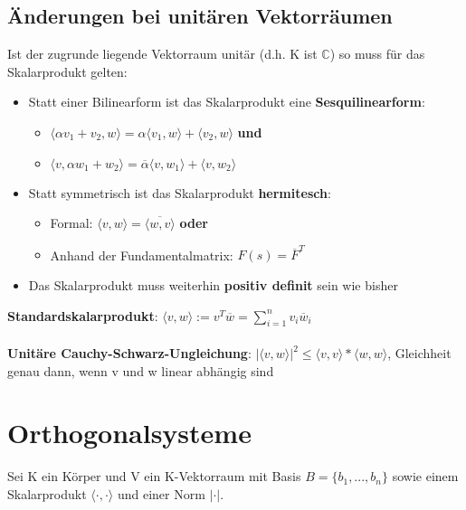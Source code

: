 \documentclass[10pt,a4paper]{article}
\def\complexnumbers{{\mathbb{C}}}
\begin{document}
	\subsection{Änderungen bei unitären Vektorräumen}
	Ist der zugrunde liegende Vektorraum unitär (d.h. K ist $\complexnumbers$) so muss für das Skalarprodukt gelten:
	\begin{itemize}
		\item Statt einer Bilinearform ist das Skalarprodukt eine \textbf{Sesquilinearform}:
		\begin{itemize}
			\item $\langle \alpha v_1 + v_2, w\rangle = \alpha\langle  v_1, w\rangle + \langle v_2, w\rangle$ \textbf{und}
			\item $\langle v, \alpha w_1 + w_2\rangle = \overline{\alpha}\langle  v, w_1\rangle + \langle v, w_2\rangle$
		\end{itemize}
		\item Statt symmetrisch ist das Skalarprodukt \textbf{hermitesch}:
			\begin{itemize}
				\item Formal: $\langle v, w\rangle = \overline{\langle w, v\rangle}$ \textbf{oder}
				\item Anhand der Fundamentalmatrix: $F(s) = \overline{F}^T$
			\end{itemize}
		\item Das Skalarprodukt muss weiterhin \textbf{positiv definit} sein wie bisher
	\end{itemize}
	\textbf{Standardskalarprodukt}: $\langle v, w\rangle := v^T\overline{w} = \sum_{i = 1}^{n} v_i\overline{w}_i$\\\\
	\textbf{Unitäre Cauchy-Schwarz-Ungleichung}: $|\langle v, w\rangle|^2 \leq \langle v, v\rangle * \langle w, w\rangle$, Gleichheit genau dann, wenn v und w linear abhängig sind
	
	\section{Orthogonalsysteme}
	Sei K ein Körper und V ein K-Vektorraum mit Basis $B = \{b_1, ..., b_n\}$ sowie einem Skalarprodukt $\langle \cdot, \cdot\rangle$ und einer Norm $|\cdot|$.
	
\end{document}
